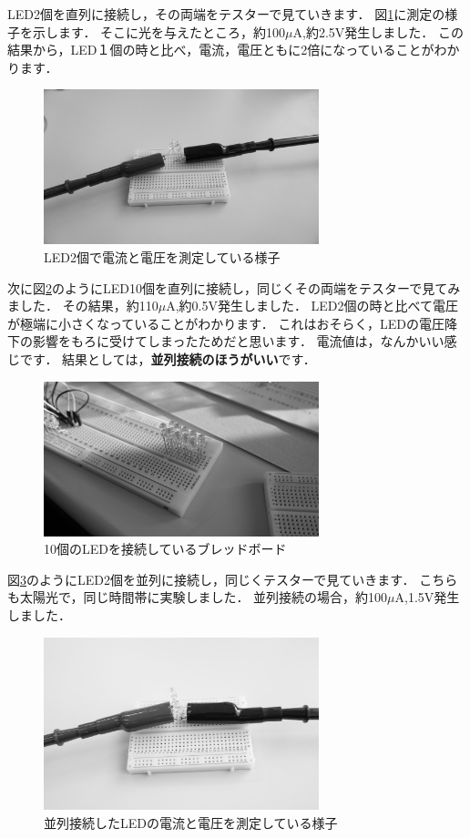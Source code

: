 LED2個を直列に接続し，その両端をテスターで見ていきます．
図\ref{fig:led2}に測定の様子を示します．
そこに光を与えたところ，約100$\mu\si\ampere$,約2.5$\si\volt$発生しました．
この結果から，LED１個の時と比べ，電流，電圧ともに2倍になっていることがわかります．

\begin{figure}[htbp]
    \centering
    \includegraphics[width=80mm]{./assets/mouse/gray/12.JPG}
    \caption{LED2個で電流と電圧を測定している様子}
    \label{fig:led2}
\end{figure}

次に図\ref{fig:led10}のようにLED10個を直列に接続し，同じくその両端をテスターで見てみました．
その結果，約110$\mu\si\ampere$,約0.5$\si\volt$発生しました．
LED2個の時と比べて電圧が極端に小さくなっていることがわかります．
これはおそらく，LEDの電圧降下の影響をもろに受けてしまったためだと思います．
電流値は，なんかいい感じです．
結果としては，\textbf{並列接続のほうがいい}です．


\begin{figure}[htbp]
    \centering
    \includegraphics[width=80mm]{./assets/mouse/gray/4.JPG}
    \caption{10個のLEDを接続しているブレッドボード}
    \label{fig:led10}
\end{figure}

図\ref{fig:led_par}のようにLED2個を並列に接続し，同じくテスターで見ていきます．
こちらも太陽光で，同じ時間帯に実験しました．
並列接続の場合，約100$\mu\si\ampere$,1.5$\si\volt$発生しました．


\begin{figure}[htbp]
    \centering
    \includegraphics[width=80mm]{./assets/mouse/gray/13.JPG}
    \caption{並列接続したLEDの電流と電圧を測定している様子}
    \label{fig:led_par}
\end{figure}


